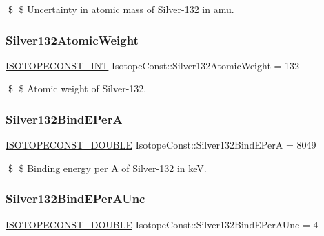 \$ \$ Uncertainty in atomic mass of Silver-\/132 in amu. \mbox{\label{group___isotope_const-_silver-_ag132_ga0cd437241f09f0c7dfabc9259dff4129}} 
\subsubsection{\texorpdfstring{Silver132\+Atomic\+Weight}{Silver132AtomicWeight}}
{\footnotesize\ttfamily \mbox{\hyperlink{group___isotope_const-_macros_ga5f18360b3e99483a35c32d789e62621c}{I\+S\+O\+T\+O\+P\+E\+C\+O\+N\+S\+T\+\_\+\+I\+NT}} Isotope\+Const\+::\+Silver132\+Atomic\+Weight = 132}

\$ \$ Atomic weight of Silver-\/132. \mbox{\label{group___isotope_const-_silver-_ag132_ga1a281add4647b090c50795efd99c722e}} 
\subsubsection{\texorpdfstring{Silver132\+Bind\+E\+PerA}{Silver132BindEPerA}}
{\footnotesize\ttfamily \mbox{\hyperlink{group___isotope_const-_macros_ga8f45a7272ce02c0b4c65c44636ed719a}{I\+S\+O\+T\+O\+P\+E\+C\+O\+N\+S\+T\+\_\+\+D\+O\+U\+B\+LE}} Isotope\+Const\+::\+Silver132\+Bind\+E\+PerA = 8049}

\$ \$ Binding energy per A of Silver-\/132 in keV. \mbox{\label{group___isotope_const-_silver-_ag132_ga538cd249ee7ca74640aadfc329b21367}} 
\subsubsection{\texorpdfstring{Silver132\+Bind\+E\+Per\+A\+Unc}{Silver132BindEPerAUnc}}
{\footnotesize\ttfamily \mbox{\hyperlink{group___isotope_const-_macros_ga8f45a7272ce02c0b4c65c44636ed719a}{I\+S\+O\+T\+O\+P\+E\+C\+O\+N\+S\+T\+\_\+\+D\+O\+U\+B\+LE}} Isotope\+Const\+::\+Silver132\+Bind\+E\+Per\+A\+Unc = 4}

